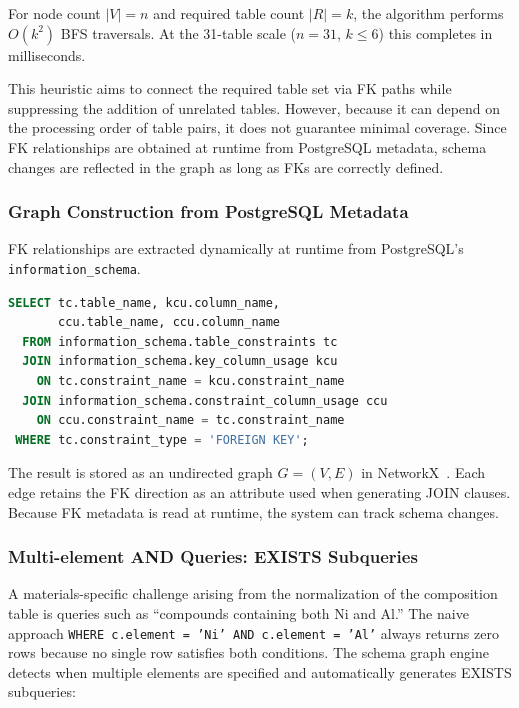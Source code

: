 For node count $|V| = n$ and required table count $|R| = k$, the algorithm performs $O(k^2)$ BFS traversals. At the 31-table scale ($n = 31$, $k \leq 6$) this completes in milliseconds.

This heuristic aims to connect the required table set via FK paths while suppressing the addition of unrelated tables. However, because it can depend on the processing order of table pairs, it does not guarantee minimal coverage. Since FK relationships are obtained at runtime from PostgreSQL metadata, schema changes are reflected in the graph as long as FKs are correctly defined.

\subsubsection{Graph Construction from PostgreSQL Metadata}

FK relationships are extracted dynamically at runtime from PostgreSQL's \texttt{information\_schema}.

\begin{lstlisting}[language=SQL,caption={Extraction of FK relationships},label=lst:fk_query,numbers=none]
SELECT tc.table_name, kcu.column_name,
       ccu.table_name, ccu.column_name
  FROM information_schema.table_constraints tc
  JOIN information_schema.key_column_usage kcu
    ON tc.constraint_name = kcu.constraint_name
  JOIN information_schema.constraint_column_usage ccu
    ON ccu.constraint_name = tc.constraint_name
 WHERE tc.constraint_type = 'FOREIGN KEY';
\end{lstlisting}

The result is stored as an undirected graph $G = (V, E)$ in NetworkX~\cite{networkx2008}. Each edge retains the FK direction as an attribute used when generating JOIN clauses. Because FK metadata is read at runtime, the system can track schema changes.

\subsubsection{Multi-element AND Queries: EXISTS Subqueries}
\label{sec:multi_element}

A materials-specific challenge arising from the normalization of the composition table is queries such as ``compounds containing both Ni and Al.'' The naive approach \texttt{WHERE c.element = 'Ni' AND c.element = 'Al'} always returns zero rows because no single row satisfies both conditions. The schema graph engine detects when multiple elements are specified and automatically generates EXISTS subqueries:

